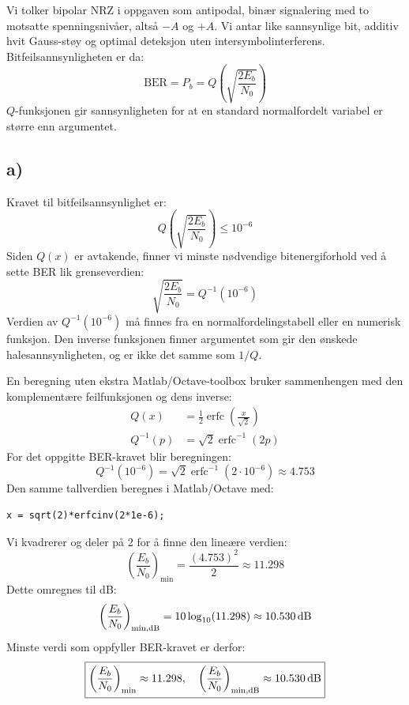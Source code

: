 Vi tolker bipolar NRZ i oppgaven som antipodal, binær signalering med to motsatte spenningsnivåer, altså $-A$ og $+A$. Vi antar like sannsynlige bit, additiv hvit Gauss-støy og optimal deteksjon uten intersymbolinterferens. Bitfeilsannsynligheten er da:
\[
    \mathrm{BER}=P_b=Q\!\left(\sqrt{\frac{2E_b}{N_0}}\right)
\]
$Q$-funksjonen gir sannsynligheten for at en standard normalfordelt variabel er større enn argumentet.

\subsection*{a)}
Kravet til bitfeilsannsynlighet er:
\[
    Q\!\left(\sqrt{\frac{2E_b}{N_0}}\right)\leq10^{-6}
\]
Siden $Q(x)$ er avtakende, finner vi minste nødvendige bitenergiforhold ved å sette BER lik grenseverdien:
\[
    \sqrt{\frac{2E_b}{N_0}}=Q^{-1}(10^{-6})
\]
Verdien av $Q^{-1}(10^{-6})$ må finnes fra en normalfordelingstabell eller en numerisk funksjon. Den inverse funksjonen finner argumentet som gir den ønskede halesannsynligheten, og er ikke det samme som $1/Q$.

En beregning uten ekstra Matlab/Octave-toolbox bruker sammenhengen med den komplementære feilfunksjonen og dens inverse:
\begin{align*}
    Q(x)&=\frac{1}{2}\operatorname{erfc}\!\left(\frac{x}{\sqrt{2}}\right)\\
    Q^{-1}(p)&=\sqrt{2}\operatorname{erfc}^{-1}(2p)
\end{align*}
For det oppgitte BER-kravet blir beregningen:
\[
    Q^{-1}(10^{-6})=\sqrt{2}\operatorname{erfc}^{-1}(2\cdot10^{-6})
                  \approx4.753
\]
Den samme tallverdien beregnes i Matlab/Octave med:
\begin{verbatim}
x = sqrt(2)*erfcinv(2*1e-6);
\end{verbatim}
Vi kvadrerer og deler på 2 for å finne den lineære verdien:
\[
    \left(\frac{E_b}{N_0}\right)_{\min}
       =\frac{(4.753)^2}{2}\approx11.298
\]
Dette omregnes til dB:
\[
    \left(\frac{E_b}{N_0}\right)_{\min,\mathrm{dB}}
       =10\log_{10}(11.298)\approx10.530\,\mathrm{dB}
\]
Minste verdi som oppfyller BER-kravet er derfor:
\[
    \boxed{\left(\frac{E_b}{N_0}\right)_{\min}\approx11.298,
    \quad\left(\frac{E_b}{N_0}\right)_{\min,\mathrm{dB}}\approx10.530\,\mathrm{dB}}
\]

\newpage
